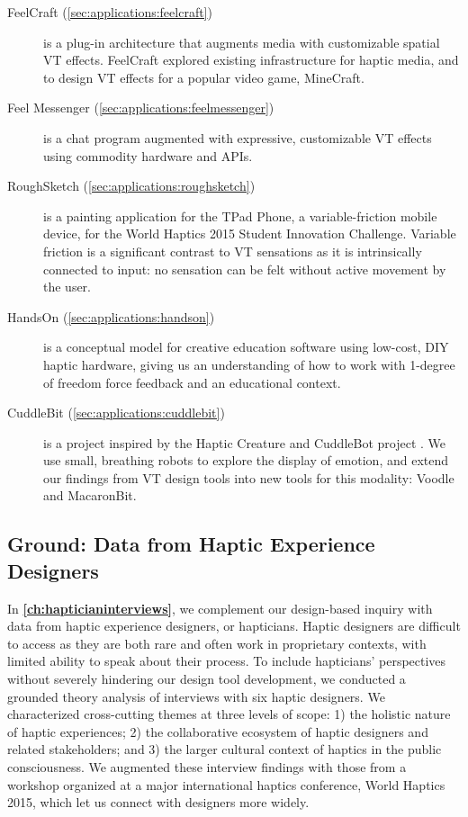 \begin{description}
	\item[FeelCraft (\autoref{sec:applications:feelcraft})] is a plug-in architecture that augments media with customizable spatial VT effects.
	FeelCraft explored existing infrastructure for haptic media, and to design VT effects for a popular video game, MineCraft.
	
	\item[Feel Messenger (\autoref{sec:applications:feelmessenger})] is a chat program augmented with expressive, customizable VT effects using commodity hardware and APIs.
	
	\item[RoughSketch (\autoref{sec:applications:roughsketch})] is a painting application for the TPad Phone, a variable-friction mobile device, for the World Haptics 2015 Student Innovation Challenge. 
	Variable friction is a significant contrast to VT sensations as it is intrinsically connected to input: no sensation can be felt without active movement by the user.
	
	\item[HandsOn (\autoref{sec:applications:handson})] is a conceptual model for creative education software using low-cost, DIY haptic hardware, giving us an understanding of how to work with 1-degree of freedom force feedback and an educational context.

	\item[CuddleBit (\autoref{sec:applications:cuddlebit})] is a project inspired by the Haptic Creature \cite{Yohanan2011affectivetouch,Yohanan2011affectdisplay,Chang2010} and CuddleBot project \cite{Allen2015cuddlebot}.
	We use small, breathing robots to explore the display of emotion, and extend our findings from VT design tools into new tools for this modality: Voodle and MacaronBit.
\end{description}





\subsection{Ground: Data from Haptic Experience Designers}
In \textbf{\autoref{ch:hapticianinterviews}}, we complement our design-based inquiry with data from haptic experience designers, or hapticians.
Haptic designers are difficult to access as they are both rare and often work in proprietary contexts, with limited ability to speak about their process.
To include hapticians' perspectives without severely hindering our design tool development, we conducted a grounded theory analysis of interviews with six haptic designers.
We characterized cross-cutting themes at three levels of scope: 1) the holistic nature of haptic experiences; 2) the collaborative ecosystem of haptic designers and related stakeholders; and 3) the larger cultural context of haptics in the public consciousness.
We augmented these interview findings with those from a workshop organized at a major international haptics conference, World Haptics 2015, which let us connect with designers more widely.

